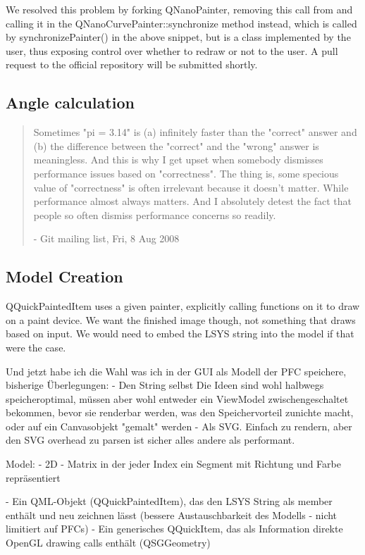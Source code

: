 We resolved this problem by forking QNanoPainter, removing this call from  and calling it in the QNanoCurvePainter::synchronize method instead, which is called by synchronizePainter() in the above snippet, but is a class implemented by the user, thus exposing control over whether to redraw or not to the user. A pull request to the official repository will be submitted shortly.


\subsection{Angle calculation}
\begin{quote}
Sometimes "pi = 3.14" is (a) infinitely faster than the "correct" answer and (b) the difference between the "correct" and the "wrong" answer is meaningless. And this is why I get upset when somebody dismisses performance issues based on "correctness". The thing is, some specious value of "correctness" is often irrelevant because it doesn't matter. While performance almost always matters. And I absolutely detest the fact that people so often dismiss performance concerns so readily.

- Git mailing list, Fri, 8 Aug 2008
\end{quote}
\subsection{Model Creation}
QQuickPaintedItem uses a given painter, explicitly calling functions on it to draw on a paint device.
We want the finished image though, not something that draws based on input. We would need to embed the LSYS string into the model if that were the case.

Und jetzt habe ich die Wahl was ich in der GUI als Modell der PFC speichere, bisherige Überlegungen:
- Den String selbst
Die Ideen sind wohl halbwegs speicheroptimal, müssen aber wohl entweder ein ViewModel zwischengeschaltet bekommen, bevor sie renderbar werden, was den Speichervorteil zunichte macht, oder auf ein Canvasobjekt "gemalt" werden
- Als SVG. Einfach zu rendern, aber den SVG overhead zu parsen ist sicher alles andere als performant.

Model: - 2D - Matrix in der jeder Index ein Segment mit Richtung und Farbe repräsentiert

- Ein QML-Objekt (QQuickPaintedItem), das den LSYS String als member enthält und neu zeichnen lässt (bessere Austauschbarkeit des Modells - nicht limitiert auf PFCs)
- Ein generisches QQuickItem, das als Information direkte OpenGL drawing calls enthält (QSGGeometry)

